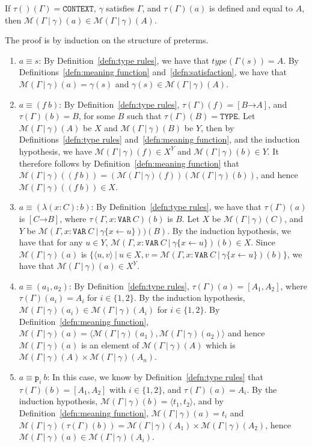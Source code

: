 \documentclass [12pt,twoside]{cslreport}
\newcommand{\thmbox}
   {{\ \hfill\hbox{%
      \vrule width1.0ex height1.0ex
   }\parfillskip 0pt }}
\newenvironment{proof}{{\bf Proof. }}{\thmbox}
\newcommand{\aro}{\mathord\rightarrow} %
\newcommand{\pair}[1]{\langle #1 \rangle}
\newcommand{\funtype}[2]{[#1 \aro #2]}
\newcommand{\tupletype}[1]{[#1]}
\newcommand{\tauGamma}[1]{\tau(\Gamma)(#1)}
\newcommand{\Mgamma}[1]{{\mathcal M}(\Gamma\vbar\gamma)(#1)}
\newcommand{\proj}[1]{\mathtt{p}_{#1}}
\newcommand{\listwo}[2]{#1_{1}, #1_{2}}
\newcommand{\tttype}{\mathtt{TYPE}}
\newcommand{\ttcontext}{\mathtt{CONTEXT}}
\newcommand{\ttvar}{\mathtt{VAR}}
\newcommand{\ittype}{\textit{type}}
\newcommand{\vbar}{\ |\ }
\begin{document}
\begin{theorem}\label{simple-term-semantics}
 If $\tau()(\Gamma) = \ttcontext$, 
   $\gamma$ satisfies $\Gamma$, and
   $\tauGamma{a}$ is defined and equal to $A$, then 
$\Mgamma{a} \in \Mgamma{A}$.  
\end{theorem}
\begin{proof}
The proof is by induction on the structure of preterms.
\begin{enumerate}
\item $a\equiv s$: By Definition~\ref{defn:type rules},
we have that $\ittype(\Gamma(s)) = A$\@.  By
Definitions~\ref{defn:meaning function}
and~\ref{defn:satisfaction}, we have that $\Mgamma{a} = \gamma(s)$
and $\gamma(s) \in
\Mgamma{A}$\@.
\item $a \equiv (f\ b)$:  By Definition~\ref{defn:type rules},
$\tauGamma{f} = \funtype{B}{A}$, and $\tauGamma{b} = B$, for some
$B$ such that $\tauGamma{B} = \tttype$\@.  
Let $\Mgamma{A}$ be $X$ and $\Mgamma{B}$ be $Y$, then 
by Definitions~\ref{defn:type rules}
and~\ref{defn:meaning function}, and the induction hypothesis, we have
$\Mgamma{f} \in X^Y$ and $\Mgamma{b}\in Y$\@.  It therefore follows
by Definition~\ref{defn:meaning function} that $\Mgamma{(f\ b)} =
(\Mgamma{f})(\Mgamma{b})$, and hence $\Mgamma{(f\ b)} \in X$\@.

\item $a \equiv (\lambda (x : C): b)$:  By
Definition~\ref{defn:type rules}, we have that
$\tauGamma{a}$ is $\funtype{C}{B}$, where
$\tau(\Gamma, x : \ttvar~C)(b)$ is $B$\@.  
Let $X$ be $\Mgamma{C}$, and $Y$ be
$\mathcal{M}(\Gamma, x: \ttvar~C \vbar \gamma\{x\gets u\}))(B)$\@.  
By the induction hypothesis, we have that for
any $u\in Y$, 
$\mathcal{M}(\Gamma, x: \ttvar~C \vbar \gamma\{x\gets u\})(b)
\in X$\@.  
Since $\Mgamma{a}$ is $\{\pair{u, v} \vbar u\in X, v = \mathcal{M}(\Gamma, x:
\ttvar~C \vbar \gamma\{x\gets u\})(b)\}$,
we have that $\Mgamma{a} \in X^Y$\@.

\item $a \equiv (a_1, a_2)$: By Definition~\ref{defn:type rules},
$\tauGamma{a} = \tupletype{\listwo{A}{n}}$, where $\tauGamma{a_i} = A_i$ for
$i\in \{1, 2\}$\@.   By the induction hypothesis, $\Mgamma{a_i}\in
\Mgamma{A_i}$ for $i\in \{1, 2\}$\@.  By
Definition~\ref{defn:meaning function}, $\Mgamma{a} =
\pair{\Mgamma{a_1},\Mgamma{a_2}}$ and hence $\Mgamma{a}$ is
an element of $\Mgamma{A}$ which is
$\Mgamma{A}\times\Mgamma{A_n}$\@.

\item $a\equiv \proj{i}~b$: In this case, we know by
Definition~\ref{defn:type rules} that $\tauGamma{b} =
\tupletype{\listwo{A}{n}}$
with $i\in \{1, 2\}$, and $\tauGamma{a} = A_i$\@.
By the induction hypothesis, $\Mgamma{b} = \pair{t_1, t_2}$,
and by Definition~\ref{defn:meaning function}, $\Mgamma{a} = t_i$
and $\Mgamma{\tauGamma{b}} =
\Mgamma{A_1}\times\Mgamma{A_2}$,
hence $\Mgamma{a}\in \Mgamma{A_i}$\@.  
\end{enumerate}
\end{proof}
\end{document}
